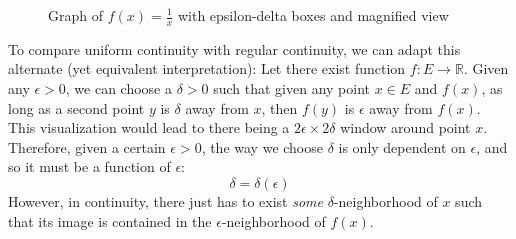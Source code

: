 \begin{example}
\begin{figure}[H]
      \caption{Graph of $f(x)=\frac{1}{x}$ with epsilon-delta boxes and magnified view}
      \label{fig:reciprocal-function}
    \end{figure}
  \end{example}

  To compare uniform continuity with regular continuity, we can adapt this alternate (yet equivalent interpretation): Let there exist function $f: E \longrightarrow \mathbb{R}$. Given any $\epsilon>0$, we can choose a $\delta>0$ such that given any point $x \in E$ and $f(x)$, as long as a second point $y$ is $\delta$ away from $x$, then $f(y)$ is $\epsilon$ away from $f(x)$. This visualization would lead to there being a $2\epsilon \times 2\delta$ window around point $x$. Therefore, given a certain $\epsilon > 0$, the way we choose $\delta$ is only dependent on $\epsilon$, and so it must be a function of $\epsilon$: 
  \begin{equation}
    \delta = \delta(\epsilon)
  \end{equation}
  However, in continuity, there just has to exist \textit{some} $\delta$-neighborhood of $x$ such that its image is contained in the $\epsilon$-neighborhood of $f(x)$. 

